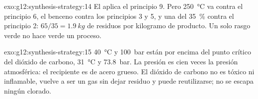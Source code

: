 \begin{solution}{exo:g12:synthesis-strategy:14}
El  aplica el principio 9. Pero \qty{250}{\celsius} va contra
el principio 6, el benceno contra los principios 3 y 5, y una  del \qty{35}{\percent} contra el principio 2: $65/35 = \qty{1.9}{kg}$
de residuos por kilogramo de producto. Un solo rasgo verde no hace verde
un proceso.
\end{solution}

\begin{solution}{exo:g12:synthesis-strategy:15}
\qty{40}{\celsius} y \qty{100}{bar} están por encima del punto crítico
del dióxido de carbono, \qty{31}{\celsius} y \qty{73.8}{bar}. La presión
es cien veces la presión atmosférica: el recipiente es de acero grueso.
El dióxido de carbono no es tóxico ni inflamable, vuelve a ser un gas sin
dejar residuo y puede reutilizarse; no se escapa ningún 
clorado.
\end{solution}

